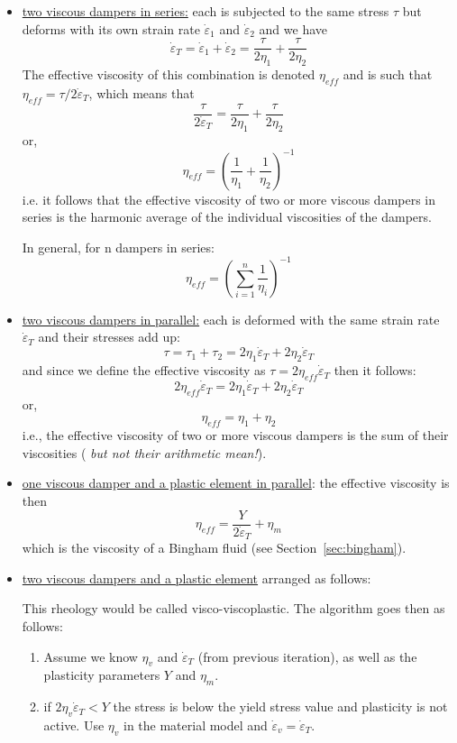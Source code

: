 \begin{itemize}
\item \underline{two viscous dampers in series:} each is subjected to the same stress $\tau$ but deforms 
with its own strain rate $\dot{\varepsilon}_1$ and $\dot{\varepsilon}_2$ and we have 
\begin{equation}
\dot{\varepsilon}_T 
= \dot{\varepsilon}_1 + \dot{\varepsilon}_2
= \frac{\tau}{2\eta_1} + \frac{\tau}{2\eta_2}
\end{equation}
The effective viscosity of this combination is denoted $\eta_{eff}$ and is such that 
$\eta_{eff}=\tau/2\dot{\varepsilon}_T$, which means that 
\[
\frac{\tau}{2\dot{\varepsilon}_T} = \frac{\tau}{2\eta_1} + \frac{\tau}{2\eta_2}
\]
or, 
\[
\eta_{eff}= \left( \frac{1}{\eta_1} + \frac{1}{\eta_2} \right)^{-1}
\]
i.e. it follows that the effective viscosity of two or more viscous dampers in series is the harmonic 
average of the individual viscosities of the dampers.

In general, for n dampers in series:
\[
\eta_{eff}= \left( \sum_{i=1}^n \frac{1}{\eta_i} \right)^{-1}
\]




\item \underline{two viscous dampers in parallel:} 
each is deformed with the same strain rate $\dot{\varepsilon}_T$
and their stresses add up:
\[
\tau = \tau_1 + \tau_2 = 2 \eta_1 \dot{\varepsilon}_T  + 2 \eta_2 \dot{\varepsilon}_T
\]
and since we define the effective viscosity as $\tau = 2 \eta_{eff} \dot{\varepsilon}_T$ then it follows:
\[
2 \eta_{eff} \dot{\varepsilon}_T = 2 \eta_1 \dot{\varepsilon}_T  + 2 \eta_2 \dot{\varepsilon}_T
\]
or, 
\[
\eta_{eff} = \eta_1 + \eta_2 
\]
i.e., the effective viscosity of two or more viscous dampers is the sum of their viscosities ({\sl 
but not their arithmetic mean!}).


\item \underline{one viscous damper and a plastic element in parallel}:
the effective viscosity is then  
\[
\eta_{eff} = \frac{Y}{2 \dot{\varepsilon}_T}+\eta_m
\]
which is the viscosity of a Bingham fluid (see Section~\ref{sec:bingham}).



\item \underline{two viscous dampers and a plastic element} arranged as follows:
\begin{center}

\end{center}
This rheology would be called visco-viscoplastic.
The algorithm goes then as follows:
\begin{enumerate}
\item Assume we know $\eta_v$ and $\dot\varepsilon_T$ (from previous iteration), as well as the plasticity parameters $Y$ and $\eta_m$.
\item if $2 \eta_v \dot\varepsilon_T < Y$ the stress is below the yield stress value and plasticity is not active. Use $\eta_v$ in the material model and $\dot\varepsilon_v=\dot\varepsilon_T$.


\end{enumerate}
\end{itemize}
